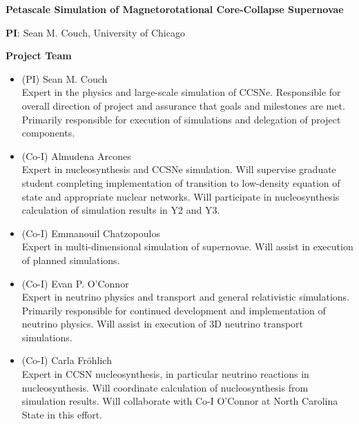 \documentclass[12pt,letterpaper,english]{article}
\newcommand{\doctitle}{Petascale Simulation of Magnetorotational Core-Collapse Supernovae}
\begin{document}
\setlength{\parindent}{0in}


\pagestyle{fancy} 
\renewcommand{\headrulewidth}{0.0pt}

\begin{center} \textbf{\doctitle{}} \\
\end{center}

\textbf{PI}:
Sean M. Couch, University of Chicago \\
\medskip

\textbf{Project Team}

\begin{itemize}
\setlength{\itemsep}{-14pt}

\item (PI) Sean M. Couch \\
Expert in the physics and large-scale simulation of CCSNe.  Responsible for overall direction of project and assurance that goals
and milestones are met.  Primarily responsible for execution of
simulations and delegation of project components.\\
\item (Co-I) Almudena Arcones \\
Expert in nucleosynthesis and CCSNe simulation.  Will supervise graduate student completing implementation of transition to low-density equation of state and appropriate nuclear networks. Will participate in nucleosynthesis calculation of simulation results in Y2 and Y3. \\
\item (Co-I) Emmanouil Chatzopoulos \\
Expert in multi-dimensional simulation of supernovae.  Will assist in execution of planned simulations.\\
\item (Co-I) Evan P. O'Connor \\
Expert in neutrino physics and transport and general relativistic
simulations.  Primarily responsible for continued development and
implementation of neutrino physics.  Will assist in execution of 3D neutrino transport simulations.  \\
\item (Co-I) Carla Fr\"ohlich \\
Expert in CCSN nucleosynthesis, in particular neutrino reactions in nucleosynthesis.  Will coordinate calculation of nucleosynthesis from simulation results.  Will collaborate with Co-I O'Connor at North Carolina State in this effort. \\

\end{itemize}
\end{document}
